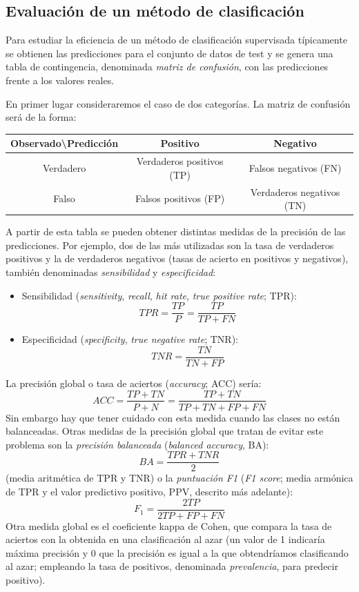\documentclass[
]{book}
\theoremstyle{break}
\theoremstyle{definition}
\theoremstyle{definition}
\theoremstyle{definition}
\theoremstyle{remark}
\begin{document}
\hypertarget{eval-class}{%
\subsection{Evaluación de un método de clasificación}\label{eval-class}}

Para estudiar la eficiencia de un método de clasificación supervisada típicamente se obtienen las predicciones para el conjunto de datos de test y se genera una tabla de contingencia, denominada \emph{matriz de confusión}, con las predicciones frente a los valores reales.

En primer lugar consideraremos el caso de dos categorías.
La matriz de confusión será de la forma:

\begin{longtable}[]{@{}ccc@{}}
\toprule
Observado\textbackslash Predicción & Positivo & Negativo\tabularnewline
\midrule
\endhead
Verdadero & Verdaderos positivos (TP) & Falsos negativos (FN)\tabularnewline
Falso & Falsos positivos (FP) & Verdaderos negativos (TN)\tabularnewline
\bottomrule
\end{longtable}

A partir de esta tabla se pueden obtener distintas medidas de la precisión de las predicciones.
Por ejemplo, dos de las más utilizadas son la tasa de verdaderos positivos y la de verdaderos negativos (tasas de acierto en positivos y negativos), también denominadas \emph{sensibilidad} y \emph{especificidad}:

\begin{itemize}
\item
  Sensibilidad (\emph{sensitivity}, \emph{recall}, \emph{hit rate}, \emph{true positive rate}; TPR):
  \[TPR = \frac{TP}{P} = \frac{TP}{TP+FN}\]
\item
  Especificidad (\emph{specificity}, \emph{true negative rate}; TNR):
  \[TNR = \frac{TN}{TN+FP}\]
\end{itemize}

La precisión global o tasa de aciertos (\emph{accuracy}; ACC) sería:
\[ACC = \frac{TP + TN}{P + N} = \frac{TP+TN}{TP+TN+FP+FN}\]
Sin embargo hay que tener cuidado con esta medida cuando las clases no están balanceadas.
Otras medidas de la precisión global que tratan de evitar este problema son la \emph{precisión balanceada} (\emph{balanced accuracy}, BA):
\[BA = \frac{TPR + TNR}{2}\]
(media aritmética de TPR y TNR) o la \emph{puntuación F1} (\emph{F1 score}; media armónica de TPR y el valor predictivo positivo, PPV, descrito más adelante):
\[F_1 = \frac{2TP}{2TP+FP+FN}\]
Otra medida global es el coeficiente kappa de Cohen, que compara la tasa de aciertos con la obtenida en una clasificación al azar
(un valor de 1 indicaría máxima precisión y 0 que la precisión es igual a la que obtendríamos clasificando al azar; empleando la tasa de positivos, denominada \emph{prevalencia}, para predecir positivo).
\end{document}
